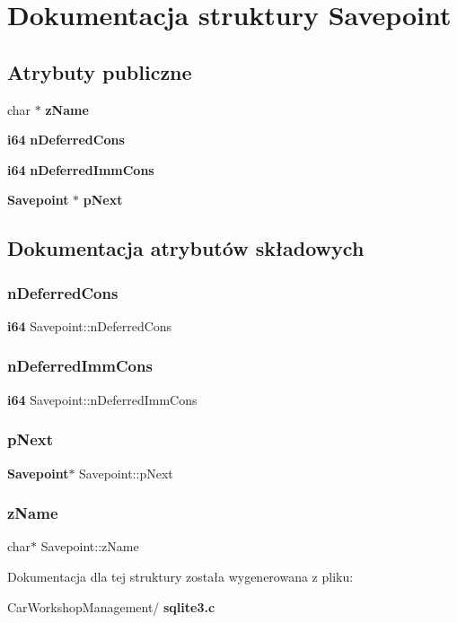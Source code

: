 \section{Dokumentacja struktury Savepoint}
\label{struct_savepoint}
\subsection*{Atrybuty publiczne}
\begin{DoxyCompactItemize}
\item 
char $\ast$ \textbf{ z\+Name}
\item 
\textbf{ i64} \textbf{ n\+Deferred\+Cons}
\item 
\textbf{ i64} \textbf{ n\+Deferred\+Imm\+Cons}
\item 
\textbf{ Savepoint} $\ast$ \textbf{ p\+Next}
\end{DoxyCompactItemize}


\subsection{Dokumentacja atrybutów składowych}
\mbox{\label{struct_savepoint_ae00dd8f725701d9e31da2edbb0b27435}} 
\subsubsection{nDeferredCons}
{\footnotesize\ttfamily \textbf{ i64} Savepoint\+::n\+Deferred\+Cons}

\mbox{\label{struct_savepoint_a91b8cb5fac1bdf7d8f76ec30c82b862d}} 
\subsubsection{nDeferredImmCons}
{\footnotesize\ttfamily \textbf{ i64} Savepoint\+::n\+Deferred\+Imm\+Cons}

\mbox{\label{struct_savepoint_a8d785c3c0eeb6f0c62ea5391892c78cb}} 
\subsubsection{pNext}
{\footnotesize\ttfamily \textbf{ Savepoint}$\ast$ Savepoint\+::p\+Next}

\mbox{\label{struct_savepoint_a0ba08ea77fcfd93099288375e2e9b1ec}} 
\subsubsection{zName}
{\footnotesize\ttfamily char$\ast$ Savepoint\+::z\+Name}



Dokumentacja dla tej struktury została wygenerowana z pliku\+:\begin{DoxyCompactItemize}
\item 
Car\+Workshop\+Management/\textbf{ sqlite3.\+c}\end{DoxyCompactItemize}
